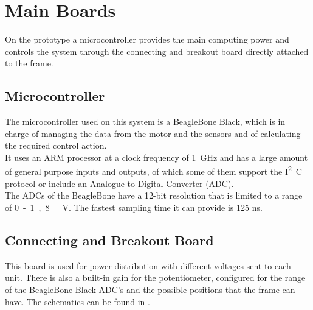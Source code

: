 \section{Main Boards}
On the prototype a microcontroller provides the main computing power and controls the system through the connecting and breakout board directly attached to the frame.

\subsection{Microcontroller}
The microcontroller used on this system is a BeagleBone Black, which is in charge of managing the data from the motor and the sensors and of calculating the required control action.\\
It uses an ARM processor at a clock frequency of \SI{1}{GHz} and has a large amount of general purpose inputs and outputs, of which some of them support the \si{I^2C} protocol or include an Analogue to Digital Converter (ADC).\\
The ADCs of the BeagleBone have a 12-bit resolution that is limited to a range of \si{0 - 1,8\ V}. The fastest sampling time it can provide is \si{125} \si{ns}\cite{Cameon}.

\subsection{Connecting and Breakout Board}
This board is used for power distribution with different voltages sent to each unit. There is also a built-in gain for the potentiometer, configured for the range of the BeagleBone Black ADC's and the possible positions that the frame can have. The schematics can be found in .

